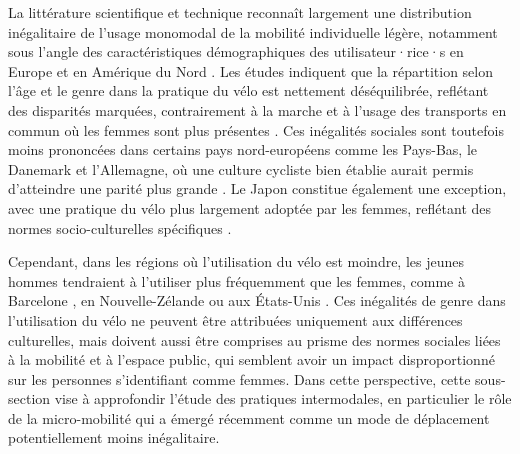 \begin{refsegment}
La littérature scientifique et technique reconnaît largement une distribution inégalitaire de l'usage monomodal de la mobilité individuelle légère, notamment sous l'angle des caractéristiques démographiques des utilisateur·rice·s en Europe et en Amérique du Nord \textcolor{blue}{\autocites[101]{handy_factors_2011}[8]{codina_built_2022}}. Les études indiquent que la répartition selon l’âge et le genre dans la pratique du vélo est nettement déséquilibrée, reflétant des disparités marquées, contrairement à la marche et à l'usage des transports en commun où les femmes sont plus présentes \textcolor{blue}{\autocite[5-7]{pollard_gender_2017}}. Ces inégalités sociales sont toutefois moins prononcées dans certains pays nord-européens comme les Pays-Bas, le Danemark et l'Allemagne, où une culture cycliste bien établie aurait permis d’atteindre une parité plus grande \textcolor{blue}{\autocites[81]{nelson_if_1997}[505]{pucher_making_2008}}. Le Japon constitue également une exception, avec une pratique du vélo plus largement adoptée par les femmes, reflétant des normes socio-culturelles spécifiques \textcolor{blue}{\autocite[21-22]{lagadic_cycling_2022}}.%

Cependant, dans les régions où l'utilisation du vélo est moindre, les jeunes hommes tendraient à l'utiliser plus fréquemment que les femmes, comme à Barcelone \textcolor{blue}{\autocite[7]{codina_built_2022}}, en Nouvelle-Zélande \textcolor{blue}{\autocite[6]{shaw_beyond_2020}} ou aux États-Unis \textcolor{blue}{\autocite[513]{garrard_women_2012}}. Ces inégalités de genre dans l'utilisation du vélo ne peuvent être attribuées uniquement aux différences culturelles, mais doivent aussi être comprises au prisme des normes sociales liées à la mobilité et à l'\gls{espace public}, qui semblent avoir un impact disproportionné sur les personnes s’identifiant comme femmes. Dans cette perspective, cette sous-section vise à approfondir l'étude des pratiques intermodales, en particulier le rôle de la micro-mobilité qui a émergé récemment comme un mode de déplacement potentiellement moins inégalitaire.%


\end{refsegment}
